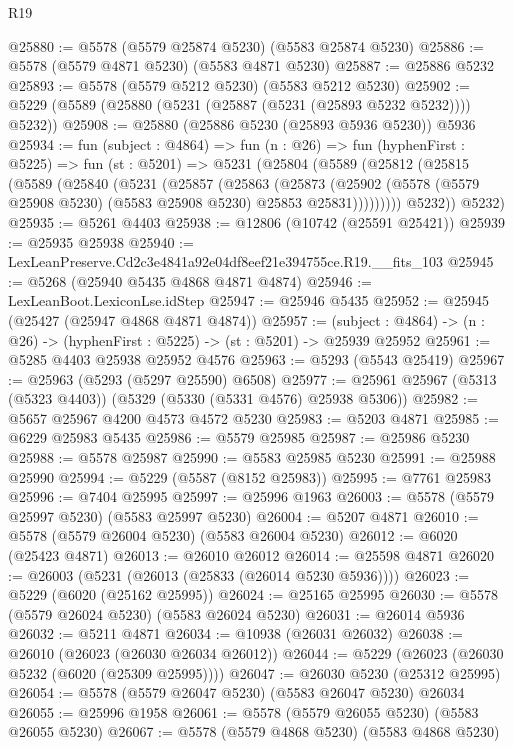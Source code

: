 \begin{lexlean}{R19}
\begin{coremodule}
@25880 := @5578 (@5579 @25874 @5230) (@5583 @25874 @5230)
@25886 := @5578 (@5579 @4871 @5230) (@5583 @4871 @5230)
@25887 := @25886 @5232
@25893 := @5578 (@5579 @5212 @5230) (@5583 @5212 @5230)
@25902 := @5229 (@5589 (@25880 (@5231 (@25887 (@5231 (@25893 @5232 @5232)))) @5232))
@25908 := @25880 (@25886 @5230 (@25893 @5936 @5230)) @5936
@25934 := fun (subject : @4864) =>
  fun (n : @26) =>
  fun (hyphenFirst : @5225) =>
  fun (st : @5201) =>
  @5231
    (@25804
      (@5589
        (@25812
          (@25815
            (@5589
              (@25840
                (@5231
                  (@25857
                    (@25863
                      (@25873
                        (@25902
                          (@5578 (@5579 @25908 @5230) (@5583 @25908 @5230) @25853 @25831)))))))))
          @5232))
      @5232)
@25935 := @5261 @4403
@25938 := @12806 (@10742 (@25591 @25421))
@25939 := @25935 @25938
@25940 := LexLeanPreserve.Cd2c3e4841a92e04df8eef21e394755ce.R19.__fits_103
@25945 := @5268 (@25940 @5435 @4868 @4871 @4874)
@25946 := LexLeanBoot.LexiconLse.idStep
@25947 := @25946 @5435
@25952 := @25945 (@25427 (@25947 @4868 @4871 @4874))
@25957 := (subject : @4864) -> (n : @26) -> (hyphenFirst : @5225) -> (st : @5201) -> @25939 @25952
@25961 := @5285 @4403 @25938 @25952 @4576
@25963 := @5293 (@5543 @25419)
@25967 := @25963 (@5293 (@5297 @25590) @6508)
@25977 := @25961 @25967 (@5313 (@5323 @4403)) (@5329 (@5330 (@5331 @4576) @25938 @5306))
@25982 := @5657 @25967 @4200 @4573 @4572 @5230
@25983 := @5203 @4871
@25985 := @6229 @25983 @5435
@25986 := @5579 @25985
@25987 := @25986 @5230
@25988 := @5578 @25987
@25990 := @5583 @25985 @5230
@25991 := @25988 @25990
@25994 := @5229 (@5587 (@8152 @25983))
@25995 := @7761 @25983
@25996 := @7404 @25995
@25997 := @25996 @1963
@26003 := @5578 (@5579 @25997 @5230) (@5583 @25997 @5230)
@26004 := @5207 @4871
@26010 := @5578 (@5579 @26004 @5230) (@5583 @26004 @5230)
@26012 := @6020 (@25423 @4871)
@26013 := @26010 @26012
@26014 := @25598 @4871
@26020 := @26003 (@5231 (@26013 (@25833 (@26014 @5230 @5936))))
@26023 := @5229 (@6020 (@25162 @25995))
@26024 := @25165 @25995
@26030 := @5578 (@5579 @26024 @5230) (@5583 @26024 @5230)
@26031 := @26014 @5936
@26032 := @5211 @4871
@26034 := @10938 (@26031 @26032)
@26038 := @26010 (@26023 (@26030 @26034 @26012))
@26044 := @5229 (@26023 (@26030 @5232 (@6020 (@25309 @25995))))
@26047 := @26030 @5230 (@25312 @25995)
@26054 := @5578 (@5579 @26047 @5230) (@5583 @26047 @5230) @26034
@26055 := @25996 @1958
@26061 := @5578 (@5579 @26055 @5230) (@5583 @26055 @5230)
@26067 := @5578 (@5579 @4868 @5230) (@5583 @4868 @5230)

\end{coremodule}
\end{lexlean}
